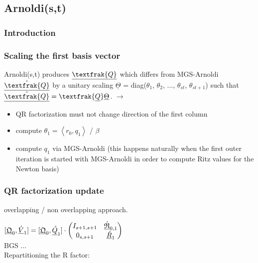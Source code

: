 \documentclass{scrartcl}
\begin{document}
\subsection{Arnoldi(s,t)}
\subsubsection{Introduction}
\subsubsection{Scaling the first basis vector}
Arnoldi(s,t) produces $\underline{\textfrak{Q}}$ which differs from MGS-Arnoldi $\underline{\hat{\textfrak{Q}}}$ by a unitary scaling $\underline{\Theta}$ = diag($\theta_1$, $\theta_2$, $\ldots$, $\theta_{st}$, $\theta_{st+1}$) such that $\underline{\hat{\textfrak{Q}}} = \textfrak{\underline{Q}}\underline{\Theta}$. $\rightarrow$
\begin{itemize}
\item QR factorization must not change direction of the first column
\item compute $\theta_1 = \left< r_0, q_1 \right>$ / $\beta$
\item compute $q_1$ via MGS-Arnoldi (this happens naturally when the first outer iteration is started with MGS-Arnoldi in order to compute Ritz values for the Newton basis)
\end{itemize}
\subsubsection{QR factorization update}
overlapping / non overlapping approach.

$[\underline{\frak{Q}}_0, \underline{\acute{V}}_1 ] = [\underline{\frak{Q}}_0, \underline{\acute{Q}}_1 ] \cdot 
\begin{pmatrix}
	I_{s + 1, s + 1} & \underline{\acute{\frak{R}}}_{0,1} \\
	0_{s,s + 1} & \underline{\acute{R}}_1 \\
\end{pmatrix}$ \\

BGS $\ldots$\\

Repartitioning the R factor:
\end{document}

